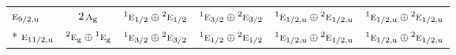 \documentclass[10pt,a4paper]{article}
\numberwithin{equation}{section}
\newcommand{\irr}[1]{\text{\normalfont\scshape #1}}
\newcommand{\conjpair}[1]{{}^{#1}}
\newcommand{\ptag}[1]{\mathrm{#1}}
\begin{document}
{\begin{longtable}{@{}lccccc@{}}
$\irr{e}_{9/2,\ptag{u}}$ & $2\,\irr{a}_{\ptag{g}}$ & $\conjpair{1}\irr{e}_{1/2}\oplus \conjpair{2}\irr{e}_{1/2}$ & $\conjpair{1}\irr{e}_{3/2}\oplus \conjpair{2}\irr{e}_{3/2}$ & $\conjpair{1}\irr{e}_{1/2,\ptag{u}}\oplus \conjpair{2}\irr{e}_{1/2,\ptag{u}}$ & $\conjpair{1}\irr{e}_{1/2,\ptag{u}}\oplus \conjpair{2}\irr{e}_{1/2,\ptag{u}}$\\*
$\irr{e}_{11/2,\ptag{u}}$ & $\conjpair{2}\irr{e}_{\ptag{g}}\oplus \conjpair{1}\irr{e}_{\ptag{g}}$ & $\conjpair{1}\irr{e}_{3/2}\oplus \conjpair{2}\irr{e}_{3/2}$ & $\conjpair{1}\irr{e}_{1/2}\oplus \conjpair{2}\irr{e}_{1/2}$ & $\conjpair{1}\irr{e}_{1/2,\ptag{u}}\oplus \conjpair{2}\irr{e}_{1/2,\ptag{u}}$ & $\conjpair{1}\irr{e}_{1/2,\ptag{u}}\oplus \conjpair{2}\irr{e}_{1/2,\ptag{u}}$\\
\bottomrule\end{longtable}}
\end{document}
